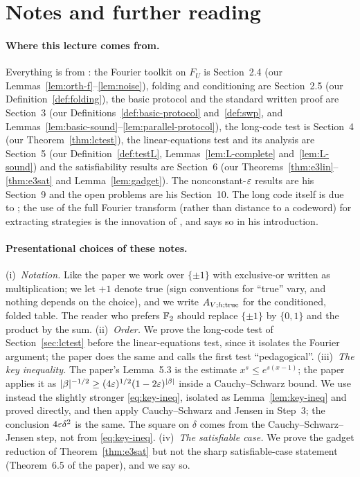 \section*{Notes and further reading}

\paragraph{Where this lecture comes from.}
Everything is from \citet{Hastad01}: the Fourier toolkit on $F_U$ is Section~2.4 (our Lemmas~\ref{lem:orth-f}--\ref{lem:noise}), folding and conditioning are Section~2.5 (our Definition~\ref{def:folding}), the basic protocol and the standard written proof are Section~3 (our Definitions~\ref{def:basic-protocol} and~\ref{def:swp}, and Lemmas~\ref{lem:basic-sound}--\ref{lem:parallel-protocol}), the long-code test is Section~4 (our Theorem~\ref{thm:lctest}), the linear-equations test and its analysis are Section~5 (our Definition~\ref{def:testL}, Lemmas~\ref{lem:L-complete} and~\ref{lem:L-sound}) and the satisfiability results are Section~6 (our Theorems~\ref{thm:e3lin}--\ref{thm:e3sat} and Lemma~\ref{lem:gadget}).  The nonconstant-$\varepsilon$ results are his Section~9 and the open problems are his Section~10.
The long code itself is due to \citet{BGS98}; the use of the full Fourier transform (rather than distance to a codeword) for extracting strategies is the innovation of \citet{Hastad99,Hastad01}, and \citet{Hastad01} says so in his introduction.

\paragraph{Presentational choices of these notes.}
(i)~\emph{Notation.}  Like the paper we work over $\{\pm1\}$ with exclusive-or written as multiplication; we let $+1$ denote true (sign conventions for ``true'' vary, and nothing depends on the choice), and we write $A_{V;h;{\rm true}}$ for the conditioned, folded table.  The reader who prefers $\mathbb{F}_2$ should replace $\{\pm1\}$ by $\{0,1\}$ and the product by the sum.
(ii)~\emph{Order.}  We prove the long-code test of Section~\ref{sec:lctest} before the linear-equations test, since it isolates the Fourier argument; the paper does the same and calls the first test ``pedagogical''.
(iii)~\emph{The key inequality.}  The paper's Lemma~5.3 is the estimate $x^s\le e^{s(x-1)}$; the paper applies it as $|\beta|^{-1/2}\ge(4\varepsilon)^{1/2}(1-2\varepsilon)^{|\beta|}$ inside a Cauchy--Schwarz bound.  We use instead the slightly stronger \eqref{eq:key-ineq}, isolated as Lemma~\ref{lem:key-ineq} and proved directly, and then apply Cauchy--Schwarz and Jensen in Step~3; the conclusion $4\varepsilon\delta^2$ is the same.  The square on $\delta$ comes from the Cauchy--Schwarz--Jensen step, not from \eqref{eq:key-ineq}.
(iv)~\emph{The satisfiable case.}  We prove the gadget reduction of Theorem~\ref{thm:e3sat} but not the sharp satisfiable-case statement (Theorem~6.5 of the paper), and we say so.

